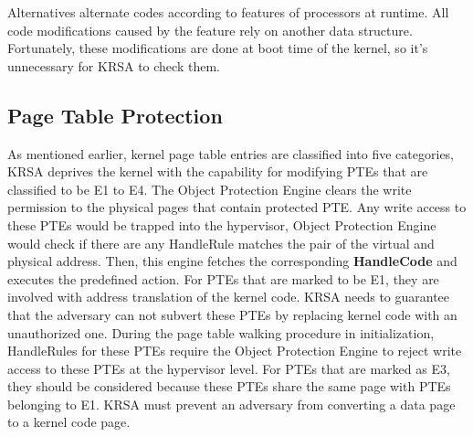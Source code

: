 \documentclass[conference]{IEEEtran}
\begin{document}
Alternatives alternate codes according to features of processors at runtime. All code modifications caused by the feature rely on another data structure. Fortunately, these modifications are done at boot time of the kernel, so it's unnecessary for KRSA to check them.

\subsection{Page Table Protection} \label{sec:pgimp}
As mentioned earlier, kernel page table entries are classified into five categories, KRSA deprives the kernel with the capability for modifying PTEs that are classified to be E1 to E4. The Object Protection Engine clears the write permission to the physical pages that contain protected PTE. Any write access to these PTEs would be trapped into the hypervisor, Object Protection Engine would check if there are any HandleRule matches the pair of the virtual and physical address. Then, this engine fetches the corresponding \textbf{HandleCode} and executes the predefined action. 
For PTEs that are marked to be E1, they are involved with address translation of the kernel code. KRSA needs to guarantee that the adversary can not subvert these PTEs by replacing kernel code with an unauthorized one. During the page table walking procedure in initialization, HandleRules for these PTEs require the Object Protection Engine to reject write access to these PTEs at the hypervisor level. 
For PTEs that are marked as E3, they should be considered because these PTEs share the same page with PTEs belonging to E1. KRSA must prevent an adversary from converting a data page to a kernel code page. 
\end{document}
